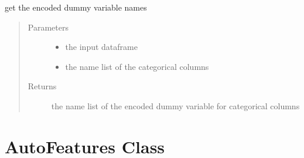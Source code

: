 \documentclass[letterpaper,11pt,english]{sphinxmanual}
\begin{document}
\begin{fulllineitems}
\begin{fulllineitems}
\end{fulllineitems}


\begin{fulllineitems}
\label{\detokenize{auto_feature:AutoFeatures.AutoFeatures.get_encoded_names}}
get the encoded dummy variable names
\begin{quote}\begin{description}
\item[{Parameters}] \leavevmode\begin{itemize}
\item {} 
 \textendash{} the input dataframe

\item {} 
 \textendash{} the name list of the categorical columns

\end{itemize}

\item[{Returns}] \leavevmode
the name list of the encoded dummy variable for categorical columns

\end{description}\end{quote}

\end{fulllineitems}


\end{fulllineitems}



\section{AutoFeatures Class}
\label{\detokenize{auto_feature:id1}}
\end{document}
